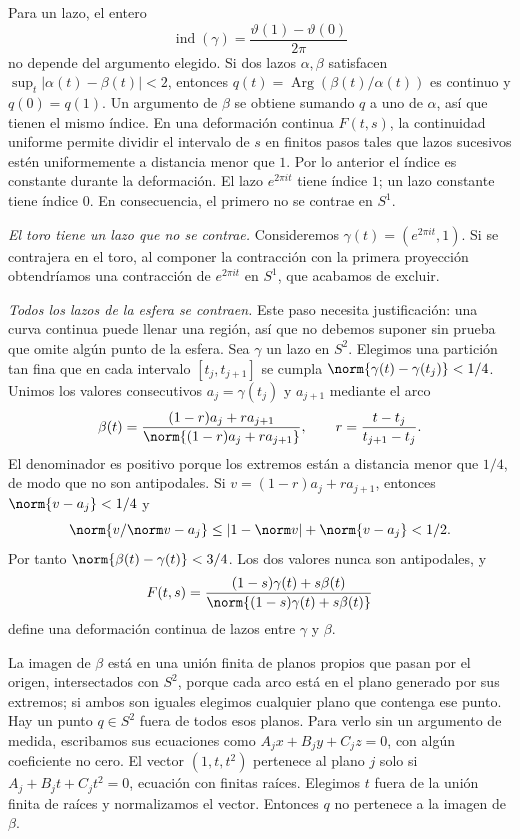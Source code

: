 \begin{solucion}
Para un lazo, el entero
\[
\operatorname{ind}(\gamma)=\frac{\vartheta(1)-\vartheta(0)}{2\pi}
\]
no depende del argumento elegido. Si dos lazos $\alpha,\beta$ satisfacen $\sup_t|\alpha(t)-\beta(t)|<2$, entonces $q(t)=\operatorname{Arg}(\beta(t)/\alpha(t))$ es continuo y $q(0)=q(1)$. Un argumento de $\beta$ se obtiene sumando $q$ a uno de $\alpha$, así que tienen el mismo índice. En una deformación continua $F(t,s)$, la continuidad uniforme permite dividir el intervalo de $s$ en finitos pasos tales que lazos sucesivos estén uniformemente a distancia menor que $1$. Por lo anterior el índice es constante durante la deformación. El lazo $e^{2\pi it}$ tiene índice $1$; un lazo constante tiene índice $0$. En consecuencia, el primero no se contrae en $S^1$.

\emph{El toro tiene un lazo que no se contrae.} Consideremos $\gamma(t)=(e^{2\pi it},1)$. Si se contrajera en el toro, al componer la contracción con la primera proyección obtendríamos una contracción de $e^{2\pi it}$ en $S^1$, que acabamos de excluir.

\emph{Todos los lazos de la esfera se contraen.} Este paso necesita justificación: una curva continua puede llenar una región, así que no debemos suponer sin prueba que omite algún punto de la esfera. Sea $\gamma$ un lazo en $S^2$. Elegimos una partición tan fina que en cada intervalo $[t_j,t_{j+1}]$ se cumpla $\norm{\gamma(t)-\gamma(t_j)}<1/4$. Unimos los valores consecutivos $a_j=\gamma(t_j)$ y $a_{j+1}$ mediante el arco
\[
\beta(t)=\frac{(1-r)a_j+ra_{j+1}}{\norm{(1-r)a_j+ra_{j+1}}},\qquad
r=\frac{t-t_j}{t_{j+1}-t_j}.
\]
El denominador es positivo porque los extremos están a distancia menor que $1/4$, de modo que no son antipodales. Si $v=(1-r)a_j+ra_{j+1}$, entonces $\norm{v-a_j}<1/4$ y
\[
\norm{v/\norm v-a_j}\le |1-\norm v|+\norm{v-a_j}<1/2.
\]
Por tanto $\norm{\beta(t)-\gamma(t)}<3/4$. Los dos valores nunca son antipodales, y
\[
F(t,s)=\frac{(1-s)\gamma(t)+s\beta(t)}{\norm{(1-s)\gamma(t)+s\beta(t)}}
\]
define una deformación continua de lazos entre $\gamma$ y $\beta$.

La imagen de $\beta$ está en una unión finita de planos propios que pasan por el origen, intersectados con $S^2$, porque cada arco está en el plano generado por sus extremos; si ambos son iguales elegimos cualquier plano que contenga ese punto. Hay un punto $q\in S^2$ fuera de todos esos planos. Para verlo sin un argumento de medida, escribamos sus ecuaciones como $A_jx+B_jy+C_jz=0$, con algún coeficiente no cero. El vector $(1,t,t^2)$ pertenece al plano $j$ solo si $A_j+B_jt+C_jt^2=0$, ecuación con finitas raíces. Elegimos $t$ fuera de la unión finita de raíces y normalizamos el vector. Entonces $q$ no pertenece a la imagen de $\beta$.


\end{solucion}
